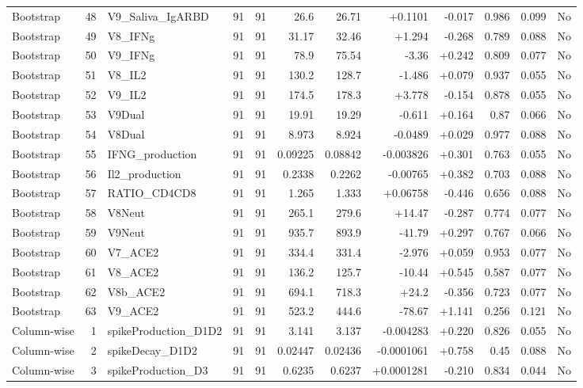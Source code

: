 \begin{landscape}
\begin{longtable}{@{}lrp{4.0cm}rrrrrrrrr@{}}
Bootstrap & 48 & V9\_Saliva\_IgARBD & 91 & 91 & 26.6 & 26.71 & +0.1101 & -0.017 & 0.986 & 0.099 & No \\
Bootstrap & 49 & V8\_IFNg & 91 & 91 & 31.17 & 32.46 & +1.294 & -0.268 & 0.789 & 0.088 & No \\
Bootstrap & 50 & V9\_IFNg & 91 & 91 & 78.9 & 75.54 & -3.36 & +0.242 & 0.809 & 0.077 & No \\
Bootstrap & 51 & V8\_IL2 & 91 & 91 & 130.2 & 128.7 & -1.486 & +0.079 & 0.937 & 0.055 & No \\
Bootstrap & 52 & V9\_IL2 & 91 & 91 & 174.5 & 178.3 & +3.778 & -0.154 & 0.878 & 0.055 & No \\
Bootstrap & 53 & V9Dual & 91 & 91 & 19.91 & 19.29 & -0.611 & +0.164 & 0.87 & 0.066 & No \\
Bootstrap & 54 & V8Dual & 91 & 91 & 8.973 & 8.924 & -0.0489 & +0.029 & 0.977 & 0.088 & No \\
Bootstrap & 55 & IFNG\_production & 91 & 91 & 0.09225 & 0.08842 & -0.003826 & +0.301 & 0.763 & 0.055 & No \\
Bootstrap & 56 & Il2\_production & 91 & 91 & 0.2338 & 0.2262 & -0.00765 & +0.382 & 0.703 & 0.088 & No \\
Bootstrap & 57 & RATIO\_CD4CD8 & 91 & 91 & 1.265 & 1.333 & +0.06758 & -0.446 & 0.656 & 0.088 & No \\
Bootstrap & 58 & V8Neut & 91 & 91 & 265.1 & 279.6 & +14.47 & -0.287 & 0.774 & 0.077 & No \\
Bootstrap & 59 & V9Neut & 91 & 91 & 935.7 & 893.9 & -41.79 & +0.297 & 0.767 & 0.066 & No \\
Bootstrap & 60 & V7\_ACE2 & 91 & 91 & 334.4 & 331.4 & -2.976 & +0.059 & 0.953 & 0.077 & No \\
Bootstrap & 61 & V8\_ACE2 & 91 & 91 & 136.2 & 125.7 & -10.44 & +0.545 & 0.587 & 0.077 & No \\
Bootstrap & 62 & V8b\_ACE2 & 91 & 91 & 694.1 & 718.3 & +24.2 & -0.356 & 0.723 & 0.077 & No \\
Bootstrap & 63 & V9\_ACE2 & 91 & 91 & 523.2 & 444.6 & -78.67 & +1.141 & 0.256 & 0.121 & No \\
Column-wise & 1 & spikeProduction\_D1D2 & 91 & 91 & 3.141 & 3.137 & -0.004283 & +0.220 & 0.826 & 0.055 & No \\
Column-wise & 2 & spikeDecay\_D1D2 & 91 & 91 & 0.02447 & 0.02436 & -0.0001061 & +0.758 & 0.45 & 0.088 & No \\
Column-wise & 3 & spikeProduction\_D3 & 91 & 91 & 0.6235 & 0.6237 & +0.0001281 & -0.210 & 0.834 & 0.044 & No \\

\end{longtable}
\end{landscape}
